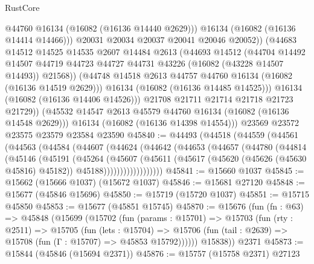 \begin{lexlean}{RustCore}
\begin{coremodule}
                    @44760
                    @16134
                    (@16082 (@16136 @14440 @2629)))
                  @16134
                  (@16082 (@16136 @14414 @14466)))
                @20031
                @20034
                @20037
                @20041
                @20046
                @20052))
            (@44683
              @14512
              @14525
              @14535
              @2607
              @14484
              @2613
              (@44693
                @14512
                (@44704
                  @14492
                  @14507
                  @44719
                  @44723
                  @44727
                  @44731
                  @43226
                  (@16082 (@43228 @14507 @14493))
                  @21568))
              (@44748 @14518 @2613 @44757 @44760 @16134 (@16082 (@16136 @14519 @2629)))
              @16134
              (@16082 (@16136 @14485 @14525)))
            @16134
            (@16082 (@16136 @14406 @14526)))
          @21708
          @21711
          @21714
          @21718
          @21723
          @21729))
      (@45532 @14547 @2613 @45579 @44760 @16134 (@16082 (@16136 @14548 @2629)))
      @16134
      (@16082 (@16136 @14398 @14554)))
    @23569
    @23572
    @23575
    @23579
    @23584
    @23590
@45840 := @44493
    (@44518
      (@44559
        (@44561
          (@44563
            (@44584
              (@44607
                (@44624
                  (@44642
                    (@44653
                      (@44657
                        (@44780
                          (@44814
                            (@45146
                              (@45191
                                (@45264
                                  (@45607
                                    (@45611
                                      (@45617
                                        (@45620 (@45626 (@45630 @45816) @45182))
                                        @45188))))))))))))))))))
@45841 := @15660 @1037
@45845 := @15662 (@15666 @1037) (@15672 @1037)
@45846 := @15681 @27120
@45848 := @15677 (@45846 @15696)
@45850 := @15719 (@15720 @1037)
@45851 := @15715 @45850
@45853 := @15677 (@45851 @15745)
@45870 := @15676
    (fun (fn : @63) =>
    @45848
      (@15699
        (@15702
          (fun (params : @15701) =>
          @15703
            (fun (rty : @2511) =>
            @15705
              (fun (lets : @15704) =>
              @15706 (fun (tail : @2639) => @15708 (fun (Γ : @15707) => @45853 @15792))))))
        @15838))
    @2371
@45873 := @15844 (@45846 (@15694 @2371))
@45876 := @15757 (@15758 @2371) @27123

\end{coremodule}
\end{lexlean}
